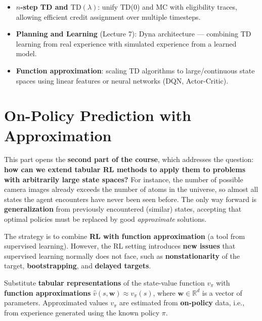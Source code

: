 \documentclass[11pt,a4paper]{article}
\theoremstyle{definition}
\theoremstyle{plain}
\theoremstyle{remark}
\begin{document}
\begin{tcolorbox}[colback=yellow!10!white, colframe=orange!80!black, title={Looking Ahead}]
\begin{itemize}
    \item \textbf{$n$-step TD and $\text{TD}(\lambda)$}: unify TD(0) and MC with eligibility traces, allowing efficient credit assignment over multiple timesteps.
    \item \textbf{Planning and Learning} (Lecture 7): Dyna architecture — combining TD learning from real experience with simulated experience from a learned model.
    \item \textbf{Function approximation}: scaling TD algorithms to large/continuous state spaces using linear features or neural networks (DQN, Actor-Critic).
\end{itemize}
\end{tcolorbox}


\part{On-Policy Prediction with Approximation}

This part opens the \textbf{second part of the course}, which addresses the question: \textbf{how can we extend tabular RL methods to apply them to problems with arbitrarily large state spaces?} For instance, the number of possible camera images already exceeds the number of atoms in the universe, so almost all states the agent encounters have never been seen before. The only way forward is \textbf{generalization} from previously encountered (similar) states, accepting that optimal policies must be replaced by good \emph{approximate} solutions.

The strategy is to combine \textbf{RL with function approximation} (a tool from supervised learning). However, the RL setting introduces \textbf{new issues} that supervised learning normally does not face, such as \textbf{nonstationarity} of the target, \textbf{bootstrapping}, and \textbf{delayed targets}.

\begin{tcolorbox}[colback=blue!5!white, colframe=blue!60!black, title={Goal of this Lecture}]
Substitute \textbf{tabular representations} of the state-value function $v_\pi$ with \textbf{function approximations} $\hat{v}(s, \mathbf{w}) \approx v_\pi(s)$, where $\mathbf{w} \in \mathbb{R}^d$ is a vector of parameters. Approximated values $v_\pi$ are estimated from \textbf{on-policy} data, i.e., from experience generated using the known policy $\pi$.
\end{tcolorbox}
\end{document}
